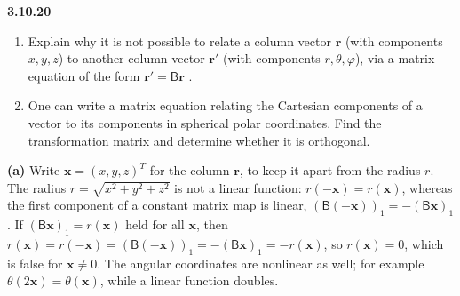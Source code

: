 \par\bigskip
\noindent\textbf{3.10.20}\quad
\begin{enumerate}
\item[(a)] Explain why it is not possible to relate a column vector
  $\mathbf{r}$ (with components $x,y,z$) to another column vector
  $\mathbf{r}'$ (with components $r,\theta,\varphi$), via a matrix equation of
  the form $\mathbf{r}'=\mathsf{B}\mathbf{r}$ .
\item[(b)] One can write a matrix equation relating the Cartesian components
  of a vector to its components in spherical polar coordinates. Find the
  transformation matrix and determine whether it is orthogonal.
\end{enumerate}
\solution
\textbf{(a)} 
Write $\mathbf x=(x,y,z)^T$ for the column $\mathbf r$, to keep it
apart from the radius $r$. The radius $r=\sqrt{x^2+y^2+z^2}$ is not
a linear function: $r(-\mathbf x)=r(\mathbf x)$, whereas the first
component of a constant matrix map is linear,
$(\mathsf B(-\mathbf x))_1=-(\mathsf B\mathbf x)_1$.
If $(\mathsf B\mathbf x)_1=r(\mathbf x)$ held for all $\mathbf x$, then
$r(\mathbf x)=r(-\mathbf x)=(\mathsf B(-\mathbf x))_1
=-(\mathsf B\mathbf x)_1=-r(\mathbf x)$, so $r(\mathbf x)=0$, which is
false for $\mathbf x\ne0$.
The angular coordinates are nonlinear as well; for example
$\theta(2\mathbf x)=\theta(\mathbf x)$, while a linear function doubles.


